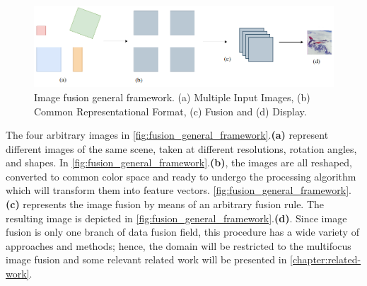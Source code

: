 \begin{figure}[ht]
	\centering
	\caption{\label{fig:fusion_general_framework}Image fusion general framework. (a) Multiple Input Images, (b) Common Representational Format, (c) Fusion and (d) Display.}
	\begin{center}
    \includegraphics[scale=0.45, trim={0 -1.5cm 0cm -1.5cm}, clip]{images/image_fusion_scheme.png}
	\end{center}
	\centering
    \fautor
\end{figure}

The four arbitrary images in \autoref{fig:fusion_general_framework}.\textbf{(a)} represent different images of the same scene, taken at different resolutions, rotation angles, and shapes. In \autoref{fig:fusion_general_framework}.\textbf{(b)}, the images are all reshaped, converted to common color space and ready to undergo the processing algorithm which will transform them into feature vectors. \autoref{fig:fusion_general_framework}.\textbf{(c)} represents the image fusion by means of an arbitrary fusion rule. The resulting image is depicted in \autoref{fig:fusion_general_framework}.\textbf{(d)}. Since image fusion is only one branch of data fusion field, this procedure has a wide variety of approaches and methods; hence, the domain will be restricted to the multifocus image fusion and some relevant related work will be presented in \autoref{chapter:related-work}.
